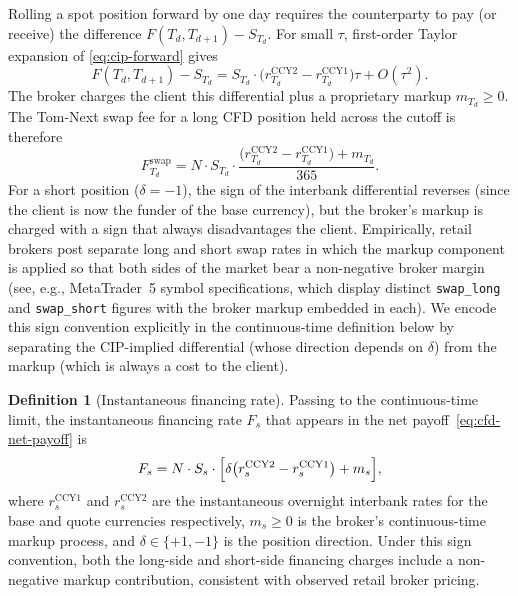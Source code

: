 \documentclass[preprint,12pt,authoryear]{elsarticle}
\theoremstyle{definition}
\newtheorem{definition}{Definition}[section]
\begin{document}
Rolling a spot position forward by one day requires the counterparty to
pay (or receive) the difference $F(T_d, T_{d+1}) - S_{T_d}$. For small
$\tau$, first-order Taylor expansion of \eqref{eq:cip-forward} gives
\begin{equation}
    F(T_d, T_{d+1}) - S_{T_d}
    = S_{T_d} \cdot
      \bigl( r^{\text{CCY2}}_{T_d} - r^{\text{CCY1}}_{T_d} \bigr) \tau
      + O(\tau^{2}).
    \label{eq:cip-expansion}
\end{equation}
The broker charges the client this differential plus a proprietary
markup $m_{T_d} \geq 0$. The Tom-Next swap fee for a long CFD position
held across the cutoff is therefore
\begin{equation}
    F^{\text{swap}}_{T_d}
    = N \cdot S_{T_d} \cdot
      \frac{\bigl( r^{\text{CCY2}}_{T_d} - r^{\text{CCY1}}_{T_d} \bigr)
             + m_{T_d}}{365}.
    \label{eq:tomnext-discrete}
\end{equation}
For a short position ($\delta = -1$), the sign of the interbank
differential reverses (since the client is now the funder of the base
currency), but the broker's markup is charged with a sign that always
disadvantages the client. Empirically, retail brokers post separate
long and short swap rates in which the markup component is applied
so that both sides of the market bear a non-negative broker margin
(see, e.g., MetaTrader~5 symbol specifications, which display distinct
\texttt{swap\_long} and \texttt{swap\_short} figures with the broker
markup embedded in each). We encode this sign convention explicitly
in the continuous-time definition below by separating the
CIP-implied differential (whose direction depends on $\delta$) from
the markup (which is always a cost to the client).

\begin{definition}[Instantaneous financing rate]
\label{def:instantaneous-financing}
Passing to the continuous-time limit, the instantaneous financing rate
$F_s$ that appears in the net payoff~\eqref{eq:cfd-net-payoff} is
\begin{equation}
    F_s
    = N \cdot S_s \cdot
      \Bigl[ \delta \bigl( r^{\text{CCY2}}_{s} - r^{\text{CCY1}}_{s} \bigr)
             + m_s \Bigr],
    \label{eq:financing-rate-continuous}
\end{equation}
where $r^{\text{CCY1}}_{s}$ and $r^{\text{CCY2}}_{s}$ are the
instantaneous overnight interbank rates for the base and quote
currencies respectively, $m_s \geq 0$ is the broker's continuous-time
markup process, and $\delta \in \{+1,-1\}$ is the position direction.
Under this sign convention, both the long-side and short-side
financing charges include a non-negative markup contribution,
consistent with observed retail broker pricing.
\end{definition}
\end{document}
